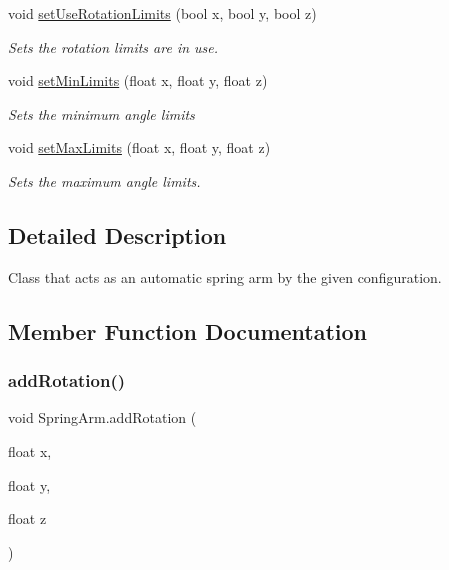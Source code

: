 \begin{DoxyCompactItemize}
void \mbox{\hyperlink{class_spring_arm_ad485a3416c203ebd091f4b4d296d832b}{set\+Use\+Rotation\+Limits}} (bool x, bool y, bool z)
\begin{DoxyCompactList}\small\item\em Sets the rotation limits are in use. \end{DoxyCompactList}\item 
void \mbox{\hyperlink{class_spring_arm_a445cee996dc3be417035da008f4a840a}{set\+Min\+Limits}} (float x, float y, float z)
\begin{DoxyCompactList}\small\item\em Sets the minimum angle limits \end{DoxyCompactList}\item 
void \mbox{\hyperlink{class_spring_arm_ad1d6e509121e9c4f7e5551801a3f3746}{set\+Max\+Limits}} (float x, float y, float z)
\begin{DoxyCompactList}\small\item\em Sets the maximum angle limits. \end{DoxyCompactList}\end{DoxyCompactItemize}


\subsection{Detailed Description}
Class that acts as an automatic spring arm by the given configuration. 



\subsection{Member Function Documentation}
\mbox{\label{class_spring_arm_a316922f360fb101c0a219720771b6d88}} 
\subsubsection{\texorpdfstring{add\+Rotation()}{addRotation()}}
{\footnotesize\ttfamily void Spring\+Arm.\+add\+Rotation (\begin{DoxyParamCaption}\item[{float}]{x,  }\item[{float}]{y,  }\item[{float}]{z }\end{DoxyParamCaption})}



